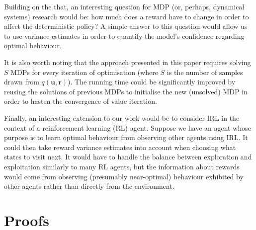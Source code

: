 \documentclass{mpaper}
\newcommand{\approximation}{q(\mathbf{u}, \mathbf{r})}
\begin{document}
Building on the that, an interesting question for MDP (or, perhaps, dynamical
systems) research would be: how much does a reward have to change in order to
affect the deterministic policy? A simple answer to this question would allow us
to use variance estimates in order to quantify the model's confidence regarding
optimal behaviour.

It is also worth noting that the approach presented in this paper requires solving
$S$ MDPs for every iteration of optimisation (where $S$ is the
number of samples drawn from $\approximation$). The running time could be
significantly improved by reusing the solutions of previous MDPs to initialise
the new (unsolved) MDP in order to hasten the convergence of value iteration.

Finally, an interesting extension to our work would be to consider IRL in the
context of a reinforcement learning (RL) agent. Suppose we have an agent whose
purpose is to learn optimal behaviour from observing other agents using IRL. It
could then take reward variance estimates into account when choosing what states
to visit next. It would have to handle the balance between exploration and
exploitation similarly to many RL agents, but the information about rewards
would come from observing (presumably near-optimal) behaviour exhibited by other
agents rather than directly from the environment.




\appendix
\section{Proofs} \label{appendix:proofs}
\end{document}
